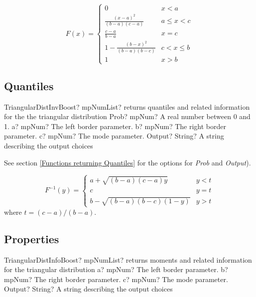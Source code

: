 \begin{equation}
	F(x)=\begin{cases}
		0  & x<a\\
		\frac{(x-a)^2}{(b-a)(c-a)} & a \leq x < c\\
		\frac{c-a}{b-a} & x = c\\
		1-\frac{(b-x)^2}{(b-a)(b-c)} & c < x \leq b\\
		1  & x>b
	\end{cases}
\end{equation}



\subsection{Quantiles}

\begin{mpFunctionsExtract}
	\mpFunctionFive
	{TriangularDistInvBoost? mpNumList? returns quantiles and related information for the the triangular distribution}
	{Prob? mpNum? A real number between 0 and 1.}
	{a? mpNum? The left border parameter.}
	{b? mpNum? The right border parameter.}
	{c? mpNum? The mode parameter.}
	{Output? String? A string describing the output choices}
\end{mpFunctionsExtract}

\vspace{0.3cm}
See section \ref{Functions returning Quantiles} for the options for  {\itshape\sffamily Prob} and {\itshape\sffamily Output}). 

\vspace{0.3cm}
\begin{equation}
	F^{-1}(y)=\begin{cases}
		a+\sqrt{(b-a)(c-a)y} & y<t\\
		c & y=t \\
		b-\sqrt{(b-a)(b-c)(1-y)} & y>t
	\end{cases}
\end{equation}
where $t=(c-a)/(b-a)$.


\subsection{Properties}
\label{TriangularDistributionProperties}


\begin{mpFunctionsExtract}
	\mpFunctionFour
	{TriangularDistInfoBoost? mpNumList? returns moments and related information for the triangular distribution}
	{a? mpNum? The left border parameter.}
	{b? mpNum? The right border parameter.}
	{c? mpNum? The mode parameter.}
	{Output? String? A string describing the output choices}
\end{mpFunctionsExtract}

